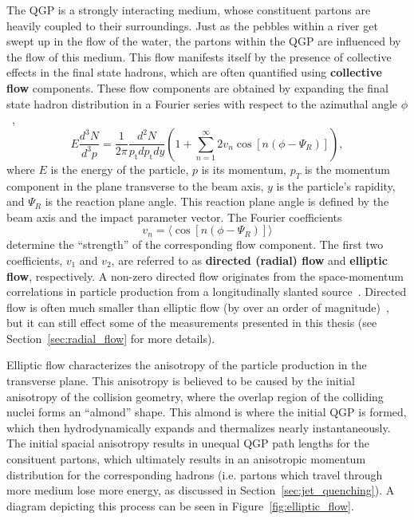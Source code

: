 The QGP is a strongly interacting medium, whose constituent partons are heavily coupled to their surroundings. Just as the pebbles within a river get swept up in the flow of the water, the partons within the QGP are influenced by the flow of this medium. This flow manifests itself by the presence of collective effects in the final state hadrons, which are often quantified using \textbf{collective flow} components. These flow components are obtained by expanding the final state hadron distribution in a Fourier series with respect to the azimuthal angle $\phi$~\cite{Flow24},
%
\begin{equation}
    \label{eq:flow_fourier}
    E \frac{d^3 N}{d^3 p}=\frac{1}{2 \pi} \frac{d^2 N}{p_{\mathrm{t}} d p_{\mathrm{t}} d y}\left(1+\sum_{n=1}^{\infty} 2 v_n \cos \left[n\left(\phi-\Psi_R\right)\right]\right),
\end{equation}
where $E$ is the energy of the particle, $p$ is its momentum, $p_T$ is the momentum component in the plane transverse to the beam axis, $y$ is the particle's rapidity, and $\Psi_R$ is the reaction plane angle. This reaction plane angle is defined by the beam axis and the impact parameter vector. The Fourier coefficients
\begin{equation}
    v_n = \langle \cos[n(\phi - \Psi_R)] \rangle
\end{equation}
determine the ``strength'' of the corresponding flow component. The first two coefficients, $v_1$ and $v_2$, are referred to as \textbf{directed (radial) flow} and \textbf{elliptic flow}, respectively. A non-zero directed flow originates from the space-momentum correlations in particle production from a longitudinally slanted source~\cite{DirectedFlow}. Directed flow is often much smaller than elliptic flow (by over an order of magnitude)~\cite{DirectedFlow2}, but it can still effect some of the measurements presented in this thesis (see Section~\ref{sec:radial_flow} for more details).

Elliptic flow characterizes the anisotropy of the particle production in the transverse plane. This anisotropy is believed to be caused by the initial anisotropy of the collision geometry, where the overlap region of the colliding nuclei forms an ``almond'' shape. This almond is where the initial QGP is formed, which then hydrodynamically expands and thermalizes nearly instantaneously. The initial spacial anisotropy results in unequal QGP path lengths for the consituent partons, which ultimately results in an anisotropic momentum distribution for the corresponding hadrons (i.e. partons which travel through more medium lose more energy, as discussed in Section~\ref{sec:jet_quenching}). A diagram depicting this process can be seen in Figure~\ref{fig:elliptic_flow}.

